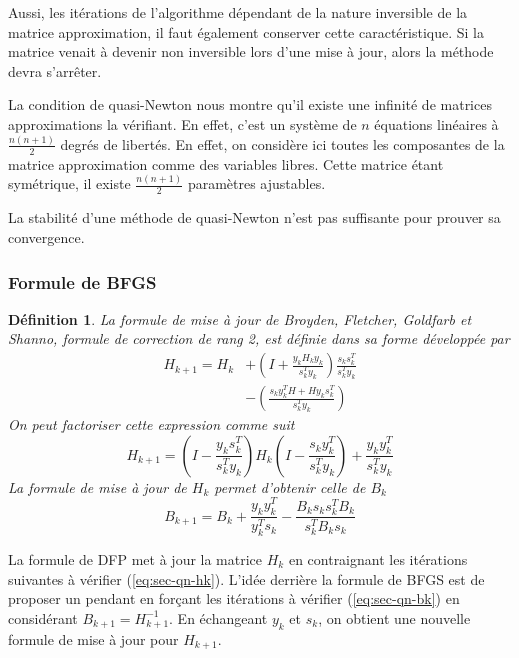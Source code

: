 \documentclass[3p, twocolumn]{elsarticle}
\newtheorem{definition}{Définition}[section]
\begin{document}
Aussi, les itérations de l'algorithme dépendant de la nature inversible de la matrice approximation, il faut également conserver cette caractéristique. Si la matrice venait à devenir non inversible lors d'une mise à jour, alors la méthode devra s'arrêter.

La condition de quasi-Newton nous montre qu'il existe une infinité de matrices approximations la vérifiant. En effet, c'est un système de $n$ équations linéaires à $\frac{n(n+1)}{2}$ degrés de libertés. En effet, on considère ici toutes les composantes de la matrice approximation comme des variables libres. Cette matrice étant symétrique, il existe $\frac{n(n+1)}{2}$ paramètres ajustables.

\begin{rmk}
    La stabilité d'une méthode de quasi-Newton n'est pas suffisante pour prouver sa convergence.
\end{rmk}

\subsubsection{Formule de BFGS}
\begin{definition}
    La formule de mise à jour de Broyden, Fletcher, Goldfarb et Shanno, formule de correction de rang 2, est définie dans sa forme développée par
    \begin{align}
        H_{k+1} = H_k & + \left(I + \frac{y_k H_k y_k}{s_k^T y_k}\right)\frac{s_k s_k^T}{s_k^T y_k}\nonumber \\
                      & -\left(\frac{s_k y_k^T H+ H y_k s_k^T}{s_k^T y_k}\right)
        \label{eq:bfgs-hk-developed}
    \end{align}
    On peut factoriser cette expression comme suit
    \begin{equation}
        H_{k+1} = \left(I - \frac{y_k s_k^T}{s_k^T y_k}\right) H_k \left(I - \frac{s_k y_k^T}{s_k^Ty_k}\right) + \frac{y_k y_k^T}{s_k^T y_k}
        \label{eq:bfgs-hk-factorised}
    \end{equation}
    La formule de mise à jour de $H_k$ permet d'obtenir celle de $B_{k}$
    \begin{equation}
        B_{k+1} = B_k + \frac{y_ky_k^T}{y_k^Ts_k}-\frac{B_ks_ks_k^TB_k}{s_k^TB_ks_k}
        \label{eq:bfgs-bk}
    \end{equation}
\end{definition}

La formule de DFP met à jour la matrice $H_k$ en contraignant les itérations suivantes à vérifier (\ref{eq:sec-qn-hk}). L'idée derrière la formule de BFGS est de proposer un pendant en forçant les itérations à vérifier (\ref{eq:sec-qn-bk}) en considérant $B_{k+1} = H_{k+1}^{-1}$. En échangeant $y_k$ et $s_k$, on obtient une nouvelle formule de mise à jour pour $H_{k+1}$.
\end{document}
